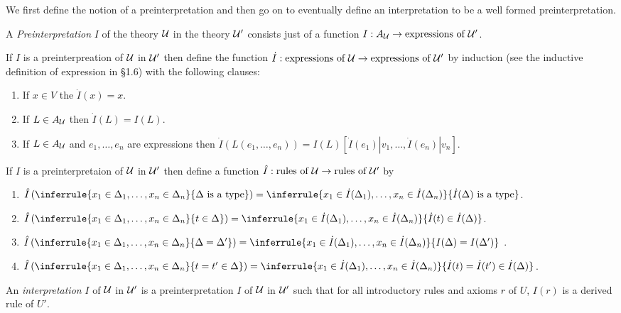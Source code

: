 We first define the notion of a preinterpretation and then go on to eventually define an interpretation to be a well formed preinterpretation.

\begin{definition}
A \emph{Preinterpretation} $I$ of the theory $\mathcal{U}$ in the theory $\mathcal{U}'$ consists just of a function $I:A_{\mathcal{U}}\to\text{expressions of }\mathcal{U}'$.

If $I$ is a preinterpreation of $\mathcal{U}$ in $\mathcal{U}'$ then define the function $\dot I : \text{expressions of }\mathcal{U}\to\text{expressions of }\mathcal{U}'$ by induction (see the inductive definition of expression in \S 1.6) with the following clauses:
\begin{enumerate}
\item If $x\in V$ the $\dot I(x) = x$.
\item If $L\in A_{\mathcal{U}}$ then $\dot I(L) = I(L)$.
\item If $L\in A_{\mathcal{U}}$ and $e_1,\ldots,e_n$ are expressions then $\dot I(L(e_1,\ldots,e_n))=I(L)[\dot I(e_1) | v_1,\ldots,\dot I(e_n)|v_n]$.
\end{enumerate}

If $I$ is a preinterpretaion of $\mathcal{U}$ in $\mathcal{U}'$ then define a function $\hat I: \text{rules of }\mathcal{U}\to\text{rules of }\mathcal{U}'$ by

\begin{enumerate}
\item $\hat I\left(\inferrule{x_1\in\Delta_1,\ldots,x_n\in\Delta_n}{\Delta\isatype}\right) = \inferrule{x_1\in\dot I(\Delta_1),\ldots,x_n\in\dot I(\Delta_n)}{\dot I(\Delta)\isatype}$.

\item $\hat I\left(\inferrule{x_1\in\Delta_1,\ldots,x_n\in\Delta_n}{t\in\Delta}\right) = \inferrule{x_1\in\dot I(\Delta_1),\ldots,x_n\in\dot I(\Delta_n)}{\dot I(t)\in\dot I(\Delta)}$.

\item $\hat I\left(\inferrule{x_1\in\Delta_1,\ldots,x_n\in\Delta_n}{\Delta=\Delta'}\right) = \inferrule{x_1\in\dot I(\Delta_1),\ldots,x_n\in\dot I(\Delta_n)}{I(\Delta)=I(\Delta')}$ .

\item $\hat I\left(\inferrule{x_1\in\Delta_1,\ldots,x_n\in\Delta_n}{t=t'\in\Delta}\right) = \inferrule{x_1\in\dot I(\Delta_1),\ldots,x_n\in\dot I(\Delta_n)}{\dot I(t) = \dot I(t')\in\dot I(\Delta)}$.
\end{enumerate}

An \emph{interpretation} $I$ of $\mathcal{U}$ in $\mathcal{U}'$ is a preinterpretation $I$ of $\mathcal{U}$ in $\mathcal{U}'$ such that for all introductory rules and axioms $r$ of $U$, $I(r)$ is a derived rule of $U'$.

\end{definition}

